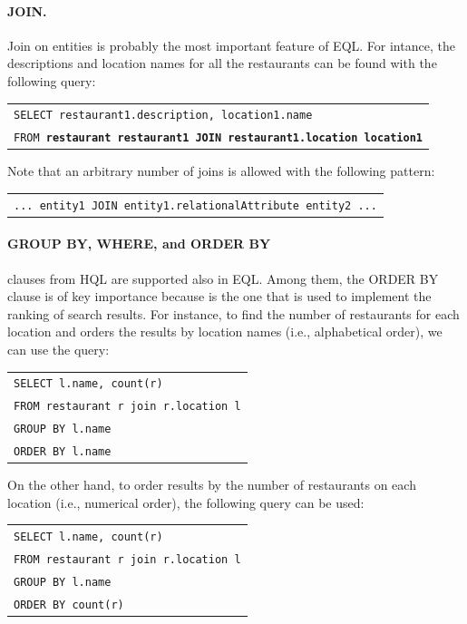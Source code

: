 \paragraph{JOIN.}
Join on entities is probably the most important feature of EQL. For intance, the descriptions and location names for all the restaurants can be found with the following query:
\begin{center}
\begin{tabular}{l}
\texttt{SELECT restaurant1.description, location1.name} \\
\texttt{FROM \textbf{restaurant restaurant1 JOIN restaurant1.location location1}}
\end{tabular}
\end{center}
Note that an arbitrary number of joins is allowed with the following pattern:
\begin{center}
\begin{tabular}{l}
\texttt{... entity1 JOIN entity1.relationalAttribute entity2 ...}\\
\end{tabular}
\end{center}


\paragraph{GROUP BY, WHERE, and ORDER BY} clauses from HQL are supported also in EQL. Among them, the ORDER BY clause is of key importance because is the one that is used to implement the ranking of search results. For instance, to find the number of restaurants for each location and orders the results by location names (i.e., alphabetical order), we can use the query:
\begin{center}
\begin{tabular}{l}
\texttt{SELECT l.name, count(r)} \\
\texttt{FROM restaurant r join r.location l} \\
\texttt{GROUP BY l.name} \\
\texttt{ORDER BY l.name} \\
\end{tabular}
\end{center}
On the other hand, to order results by the number of restaurants on each location (i.e., numerical order), the following query can be used:
\begin{center}
\begin{tabular}{l}
\texttt{SELECT l.name, count(r)} \\
\texttt{FROM restaurant r join r.location l} \\
\texttt{GROUP BY l.name} \\
\texttt{ORDER BY count(r)} \\
\end{tabular}
\end{center}

